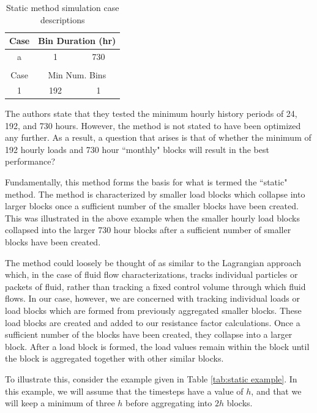 \documentclass[review,12pt]{elsarticle}
\begin{document}
\begin{table}[htbp!]
\centering
\caption{Static method simulation case descriptions}
\label{tab:static cases}
\begin{tabular}{ccc}
Case                    & \multicolumn{2}{c}{Bin Duration (hr)}               \\ \hline
\multicolumn{1}{|c|}{a} & \multicolumn{1}{c|}{1}   & \multicolumn{1}{c|}{730} \\ \hline
                        &                          &                          \\
Case                    & \multicolumn{2}{c}{Min Num. Bins}                   \\ \hline
\multicolumn{1}{|c|}{1} & \multicolumn{1}{c|}{192} & \multicolumn{1}{c|}{1}   \\ \hline
\end{tabular}
\end{table}
The authors state that they tested the minimum hourly history periods of 24, 192, and 730 hours. However, the method is not stated to have been optimized any further. As a result, a question that arises is that of whether the minimum of 192 hourly loads and 730 hour ``monthly" blocks will result in the best performance?

Fundamentally, this method forms the basis for what is termed the ``static" method. The method is characterized by smaller load blocks which collapse into larger blocks once a sufficient number of the smaller blocks have been created. This was illustrated in the above example when the smaller hourly load blocks collapsed into the larger 730 hour blocks after a sufficient number of smaller blocks have been created. 

The method could loosely be thought of as similar to the Lagrangian approach which, in the case of fluid flow characterizations, tracks individual particles or packets of fluid, rather than tracking a fixed control volume through which fluid flows. In our case, however, we are concerned with tracking individual loads or load blocks which are formed from previously aggregated smaller blocks. These load blocks are created and added to our resistance factor calculations. Once a sufficient number of the blocks have been created, they collapse into a larger block. After a load block is formed, the load values remain within the block until the block is aggregated together with other similar blocks.

To illustrate this, consider the example given in Table \ref{tab:static example}. In this example, we will assume that the timesteps have a value of $h$, and that we will keep a minimum of three $h$ before aggregating into $2h$ blocks.
\end{document}
